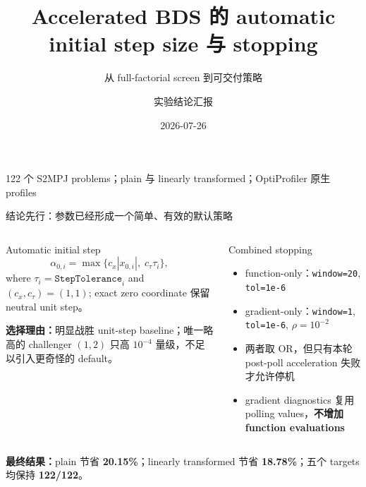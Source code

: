 \documentclass[aspectratio=169,10pt]{beamer}
\title{Accelerated BDS 的 automatic initial step size 与 stopping}
\subtitle{从 full-factorial screen 到可交付策略}
\author{实验结论汇报}
\date{2026-07-26}
\newcommand{\good}[1]{\textcolor{BDSGreen}{\bfseries #1}}
\newcommand{\tight}{\setlength{\itemsep}{0.35em}\setlength{\parskip}{0pt}}
\begin{document}
{
\begin{frame}[plain]
  \vfill
  \titlepage
  \vfill
  \begin{center}
    \color{white!80}\small 122 个 S2MPJ problems；plain 与 linearly transformed；OptiProfiler 原生 profiles
  \end{center}
\end{frame}}

\begin{frame}{结论先行：参数已经形成一个简单、有效的默认策略}
\begin{columns}[T,onlytextwidth]
\begin{block}{Automatic initial step}
\small
\[
\alpha_{0,i}=\max\{c_x|x_{0,i}|,\;c_\tau\tau_i\},
\]
where $\tau_i=\texttt{StepTolerance}_i$ and $(c_x,c_\tau)=(1,1)$;
exact zero coordinate 保留 neutral unit step。

\medskip
\good{选择理由：}明显战胜 unit-step baseline；唯一略高的 challenger $(1,2)$ 只高 $10^{-4}$ 量级，不足以引入更奇怪的 default。
\end{block}

\begin{block}{Combined stopping}
\begin{itemize}\tight
  \item function-only：\texttt{window=20}, \texttt{tol=1e-6}
  \item gradient-only：\texttt{window=1}, \texttt{tol=1e-6}, $\rho=10^{-2}$
  \item 两者取 OR，但只有本轮 post-poll acceleration 失败才允许停机
  \item gradient diagnostics 复用 polling values，\good{不增加 function evaluations}
\end{itemize}
\end{block}
\end{columns}

\vspace{0.5em}
\centering
\colorbox{BDSLight}{\parbox{0.92\textwidth}{\centering
\good{最终结果：}plain 节省 \textbf{20.15\%}；linearly transformed 节省 \textbf{18.78\%}；五个 targets 均保持 \textbf{122/122}。}}
\end{frame}
\end{document}
